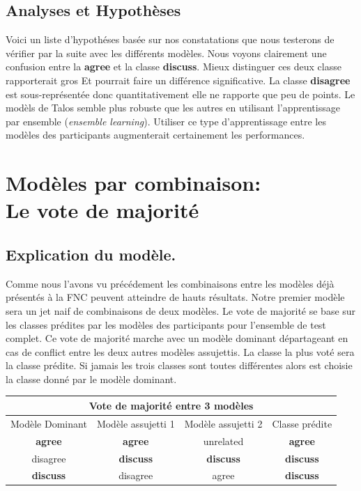 \documentclass[11pt,a4paper,oldfontcommands]{memoir}
\begin{document}
\subsection{Analyses et Hypothèses}
Voici un liste d'hypothéses basée sur nos constatations que nous testerons de vérifier par la suite avec les différents modèles.
Nous voyons clairement une confusion entre la \textbf{agree} et la classe \textbf{discuss}.
Mieux distinguer ces deux classe rapporterait gros Et pourrait faire un différence significative.
La classe \textbf{disagree} est sous-représentée donc quantitativement elle ne rapporte que peu de points.
Le modèls de Talos semble plus robuste que les autres en utilisant l'apprentissage par ensemble (\textit{ensemble learning}).
Utiliser ce type d'apprentissage entre les modèles des participants augmenterait certainement les performances.

\section{Modèles par combinaison:\\ Le vote de majorité}
\subsection{Explication du modèle.}
Comme nous l'avons vu précédement les combinaisons entre les modèles déjà présentés à la FNC peuvent atteindre de hauts résultats.
Notre premier modèle sera un jet naif de combinaisons de deux modèles.
Le vote de majorité se base sur les classes prédites par les modèles des participants pour l'ensemble de test complet.
Ce vote de majorité marche avec un modèle dominant départageant en cas de conflict entre les deux autres modèles assujettis.
La classe la plus voté sera la classe prédite.
Si jamais les trois classes sont toutes différentes alors est choisie la classe donné par le modèle dominant.

\begin{center}
 \begin{tabular}{  c c c || c  }
  \multicolumn{4}{c}{Vote de majorité entre 3 modèles}                          \\
  \hline
  Modèle Dominant  & Modèle assujetti 1 & Modèle assujetti 2 & Classe prédite   \\
  \hline
  \textbf{agree}   & \textbf{agree}     & unrelated          & \textbf{agree}   \\
  disagree         & \textbf{discuss}   & \textbf{discuss}   & \textbf{discuss} \\
  \textbf{discuss} & disagree           & agree              & \textbf{discuss} \\
 \end{tabular}
\end{center}
\end{document}
